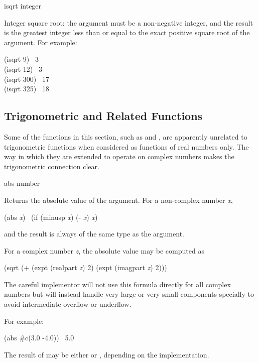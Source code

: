 \begin{defun}[Function]
isqrt integer

Integer square root: the argument must be a non-negative integer, and the
result is the greatest integer less than or equal to the exact positive
square root of the argument.
For example:
\begin{lisp}
(isqrt 9) \EV\ 3 \\
(isqrt 12) \EV\ 3 \\
(isqrt 300) \EV\ 17 \\
(isqrt 325) \EV\ 18
\end{lisp}
\end{defun}

\subsection{Trigonometric and Related Functions}

Some of the functions in this section, such as 
and , are apparently unrelated
to trigonometric functions when considered as functions of
real numbers only.  The way in which they are extended to
operate on complex numbers makes the trigonometric connection clear.

\begin{defun}[Function]
abs number

Returns the absolute value of the argument.  For a non-complex number \emph{x},
\begin{lisp}
(abs \emph{x}) \EQ\ (if (minusp \emph{x}) (- \emph{x}) \emph{x})
\end{lisp}
and the result is always of the same type as the argument.

For a complex number \emph{z}, the absolute value may be computed as
\begin{lisp}
(sqrt (+ (expt (realpart \emph{z}) 2) (expt (imagpart \emph{z}) 2)))
\end{lisp}

\beforenoterule
\begin{implementation}
The careful implementor will not use this formula directly
for all complex numbers
but will instead handle very large or very small components specially
to avoid intermediate overflow or underflow.
\end{implementation}
\afternoterule

For example:
\begin{lisp}
(abs \#c(3.0 -4.0)) \EV\ 5.0
\end{lisp}
The result of  may be either  or ,
depending on the implementation.
\end{defun}

